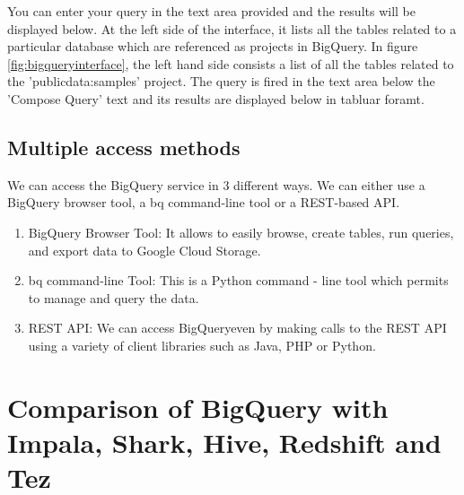 \documentclass[9pt,twocolumn,twoside]{../../styles/osajnl}
\begin{document}
\noindent
You can enter your query in the text area provided and the results
will be displayed below. At the left side of the interface, it lists
all the tables related to a particular database which are referenced
as projects in BigQuery. In figure \ref{fig:bigqueryinterface}, the
left hand side consists a list of all the tables related to the
'publicdata:samples' project. The query is fired in the text area
below the 'Compose Query' text and its results are displayed below in tabluar foramt.

\subsection{Multiple access methods}
We can access the BigQuery service in 3 different ways. We can either
use a BigQuery browser tool, a bq command-line tool or a REST-based
API. \begin{enumerate}
\item BigQuery Browser Tool: It allows to easily browse, create
  tables, run queries, and export data to Google Cloud Storage.
\item bq command-line Tool: This is a Python command - line tool which
  permits to manage and query the data. \item REST API: We can access
  BigQueryeven by making calls to the REST API using a variety of client
  libraries such as Java, PHP or Python.  \end{enumerate}


\section{Comparison of BigQuery with Impala, Shark, Hive, Redshift and Tez}
\end{document}
